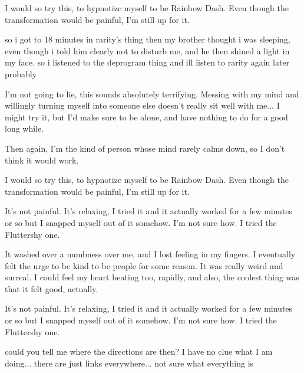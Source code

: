 \documentclass[ebook,12pt,oneside,openany]{memoir}
\newcommand{\mytexttilde}{\raisebox{0.5ex}{\texttildelow}}
\begin{document}
\begin{tcolorbox}[title=Scootalove]
\par{I would so try this, to hypnotize myself to be Rainbow Dash. Even though the transformation would be painful, I'm still up for it.}
\end{tcolorbox}
\begin{tcolorbox}[title=DeleteAccount]
\par{so i got to 18 minutes in rarity's thing then my brother thought i was sleeping, even though i told him clearly not to disturb me, and he then shined a light in my face. so i listened to the deprogram thing and ill listen to rarity again later probably}
\end{tcolorbox}
\begin{tcolorbox}[title=Antismurf9001]
\par{I'm not going to lie, this sounds absolutely terrifying.  Messing with my mind and willingly turning myself into someone else doesn't really sit well with me...  I might try it, but I'd make sure to be alone, and have nothing to do for a good long while.}
\newline{}
\par{Then again, I'm the kind of person whose mind rarely calms down, so I don't think it would work.}
\end{tcolorbox}
\begin{tcolorbox}[title=Harmonic Revelations,colback=brown!5!white,colframe=brown!75!black,coltitle=white]
\begin{tcolorbox}[title=\mytexttilde{}Chaotic Lightning\mytexttilde{}]
\par{I would so try this, to hypnotize myself to be Rainbow Dash. Even though the transformation would be painful, I'm still up for it.}
\end{tcolorbox}
\par{It's not painful. It's relaxing, I tried it and it actually worked for a few minutes or so but I snapped myself out of it somehow. I'm not sure how. I tried the Fluttershy one.}
\newline{}
\newline{}
\par{It washed over a numbness over me, and I lost feeling in my fingers. I eventually felt the urge to be kind to be people for some reason. It was really weird and surreal. I could feel my heart beating too, rapidly, and also, the coolest thing was that it felt good, actually.}
\end{tcolorbox}
\begin{tcolorbox}[title=Delete this account,colback=purple!5!white,colframe=purple!75!black,coltitle=white]
\begin{tcolorbox}[title=\mytexttilde{}Lawful Aeternae Salvtis\mytexttilde{}]
It's not painful. It's relaxing, I tried it and it actually worked for a few minutes or so but I snapped myself out of it somehow. I'm not sure how. I tried the Fluttershy one.\end{tcolorbox}
could you tell me where the directions are then? I have no clue what I am doing... there are just links everywhere... not sure what everything is\end{tcolorbox}
\end{document}
